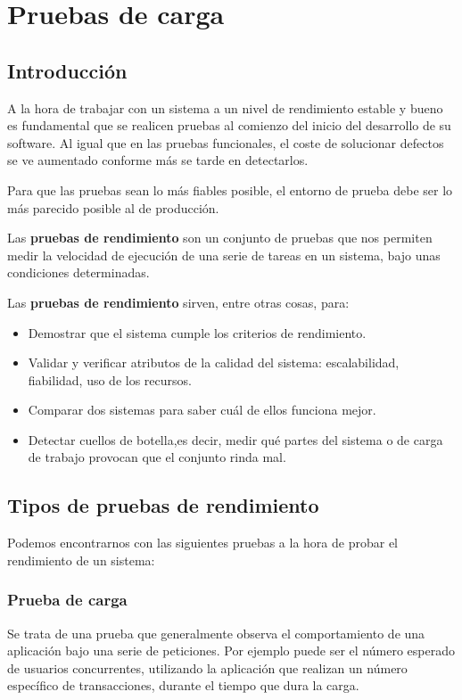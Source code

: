 
\chapter{Pruebas de carga} \label{ch:carga}
\section{Introducción}
A la hora de trabajar con un sistema a un nivel de rendimiento estable y bueno es fundamental que se realicen pruebas al comienzo del inicio del desarrollo de su software. Al igual que en las pruebas funcionales, el coste de solucionar defectos se ve aumentado conforme más se tarde en detectarlos.\cite{performingtest}

Para que las pruebas sean lo más fiables posible, el entorno de prueba debe ser lo más parecido posible al de producción.

Las \textbf{pruebas de rendimiento} son un conjunto de pruebas que nos permiten medir la velocidad de ejecución de una serie de tareas en un sistema, bajo unas condiciones determinadas.

Las \textbf{pruebas de rendimiento} sirven, entre otras cosas, para:
\begin{itemize}
	\item Demostrar que el sistema cumple los criterios de rendimiento.
	\item Validar y verificar atributos de la calidad del sistema: escalabilidad, fiabilidad, uso de los recursos.
	\item Comparar dos sistemas para saber cuál de ellos funciona mejor.
	\item Detectar cuellos de botella,es decir, medir qué partes del sistema o de carga de trabajo provocan que el conjunto rinda mal.
\end{itemize}
\newpage
\section{Tipos de pruebas de rendimiento}

Podemos encontrarnos con las siguientes pruebas a la hora de probar el rendimiento de un sistema:
\subsection{Prueba de carga}
Se trata de una prueba que generalmente observa el comportamiento de una aplicación bajo una serie de peticiones. 
Por ejemplo puede ser el número esperado de usuarios concurrentes, utilizando la aplicación que realizan un número específico de transacciones, durante el tiempo que dura la carga.

